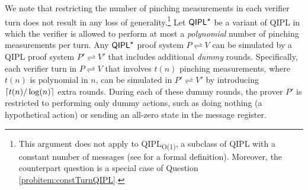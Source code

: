 \documentclass[11pt, a4paper]{article}
\numberwithin{equation}{section}
\numberwithin{figure}{section}
\newcommand{\QIPL}{\textnormal{\textsf{QIPL}}\xspace}
\newcommand{\QIPLconst}{\texorpdfstring{\textnormal{\textsf{QIPL}\textsubscript{O(1)}}}\xspace}
\newcommand{\protocol}[2]{{#1}\!\rightleftharpoons\!{#2}}
\DeclarePairedDelimiter\ceil{\lceil}{\rceil}
\begin{document}
\begin{remark}
    \label{remark:restrict-measurement-times}
    We note that restricting the number of pinching measurements in each verifier turn does not result in any loss of generality.\footnote{This argument does not apply to \QIPLconst{}, a subclass of \QIPL{} with a constant number of messages (see  for a formal definition). Moreover, the counterpart question is a special case of Question \ref{probitem:constTurnQIPL}.} 
    Let $\QIPL^\star$ be a variant of \QIPL{} in which the verifier is allowed to perform at most a \textit{polynomial} number of pinching measurements per turn. Any $\QIPL^\star$ proof system $\protocol{P}{V}$ can be simulated by a \QIPL{} proof system $\protocol{P'}{V'}$ that includes additional \textit{dummy} rounds. Specifically, each verifier turn in $\protocol{P}{V}$ that involves $t(n)$ pinching measurements, where $t(n)$ is polynomial in $n$, can be simulated in $\protocol{P'}{V'}$ by introducing $\ceil{t(n)/\log(n)}$ extra rounds. During each of these dummy rounds, the prover $P'$ is restricted to performing only dummy actions, such as doing nothing (a hypothetical action) or sending an all-zero state in the message register. 
\end{remark}
\end{document}
